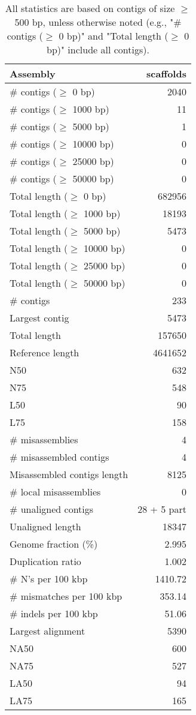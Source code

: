 \documentclass[12pt,a4paper]{article}
\begin{document}
\begin{table}[ht]
\begin{center}
\caption{All statistics are based on contigs of size $\geq$ 500 bp, unless otherwise noted (e.g., "\# contigs ($\geq$ 0 bp)" and "Total length ($\geq$ 0 bp)" include all contigs).}
\begin{tabular}{|l*{1}{|r}|}
\hline
Assembly & scaffolds \\ \hline
\# contigs ($\geq$ 0 bp) & 2040 \\ \hline
\# contigs ($\geq$ 1000 bp) & 11 \\ \hline
\# contigs ($\geq$ 5000 bp) & 1 \\ \hline
\# contigs ($\geq$ 10000 bp) & 0 \\ \hline
\# contigs ($\geq$ 25000 bp) & 0 \\ \hline
\# contigs ($\geq$ 50000 bp) & 0 \\ \hline
Total length ($\geq$ 0 bp) & 682956 \\ \hline
Total length ($\geq$ 1000 bp) & 18193 \\ \hline
Total length ($\geq$ 5000 bp) & 5473 \\ \hline
Total length ($\geq$ 10000 bp) & 0 \\ \hline
Total length ($\geq$ 25000 bp) & 0 \\ \hline
Total length ($\geq$ 50000 bp) & 0 \\ \hline
\# contigs & 233 \\ \hline
Largest contig & 5473 \\ \hline
Total length & 157650 \\ \hline
Reference length & 4641652 \\ \hline
N50 & 632 \\ \hline
N75 & 548 \\ \hline
L50 & 90 \\ \hline
L75 & 158 \\ \hline
\# misassemblies & 4 \\ \hline
\# misassembled contigs & 4 \\ \hline
Misassembled contigs length & 8125 \\ \hline
\# local misassemblies & 0 \\ \hline
\# unaligned contigs & 28 + 5 part \\ \hline
Unaligned length & 18347 \\ \hline
Genome fraction (\%) & 2.995 \\ \hline
Duplication ratio & 1.002 \\ \hline
\# N's per 100 kbp & 1410.72 \\ \hline
\# mismatches per 100 kbp & 353.14 \\ \hline
\# indels per 100 kbp & 51.06 \\ \hline
Largest alignment & 5390 \\ \hline
NA50 & 600 \\ \hline
NA75 & 527 \\ \hline
LA50 & 94 \\ \hline
LA75 & 165 \\ \hline
\end{tabular}
\end{center}
\end{table}
\end{document}
